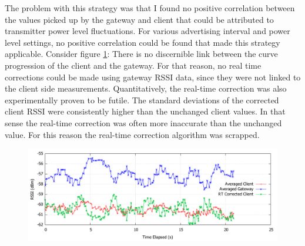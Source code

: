 \documentclass[a4paper, oneside]{ipsreport}
\begin{document}
The problem with this strategy was that I found no positive correlation between the values picked up by the gateway and client that could be attributed to transmitter power level fluctuations. For various advertising interval and power level settings, no positive correlation could be found that made this strategy applicable. Consider figure \ref{fig:realtimecorrection}: There is no discernible link between the curve progression of the client and the gateway. For that reason, no real time corrections could be made using gateway RSSI data, since they were not linked to the client side measurements. Quantitatively, the real-time correction was also experimentally proven to be futile. The standard deviations of the corrected client RSSI were consistently higher than the unchanged client values. In that sense the real-time correction was often more inaccurate than the unchanged value. For this reason the real-time correction algorithm was scrapped.
\begin{figure}[h!]
	\centering
	\includegraphics[width=\linewidth]{./figures/realtimecorrection.pdf}
	\label{fig:realtimecorrection}
\end{figure}

\newpage
\end{document}
